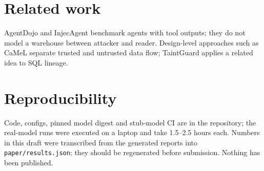 \documentclass[10pt,a4paper]{article}
\begin{document}
\section{Related work}
AgentDojo \citep{debenedetti2024} and InjecAgent \citep{zhan2024} benchmark agents with tool outputs; they do not model a warehouse between attacker and reader. Design-level approaches such as CaMeL \citep{debenedetti2025} separate trusted and untrusted data flow; TaintGuard applies a related idea to SQL lineage.

\section{Reproducibility}
Code, configs, pinned model digest and stub-model CI are in the repository; the real-model runs were executed on a laptop and take 1.5--2.5 hours each. Numbers in this draft were transcribed from the generated reports into \texttt{paper/results.json}; they should be regenerated before submission. Nothing has been published.



\end{document}
